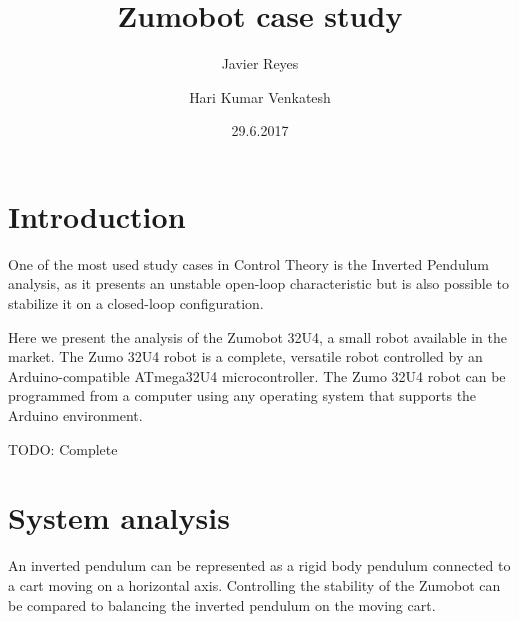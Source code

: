 \documentclass{article}
\title{Zumobot case study}
\date{29.6.2017}
\author{Javier Reyes \and Hari Kumar Venkatesh}
\begin{document}
\maketitle
{}	%
\newpage
{}	%

\tableofcontents
\newpage

\section*{Introduction}	%

One of the most used study cases in Control Theory is the Inverted Pendulum analysis, as it presents an unstable open-loop characteristic but is also possible to stabilize it on a closed-loop configuration.

Here we present the analysis of the Zumobot 32U4, a small robot available in the market. The Zumo 32U4 robot is a complete, versatile robot controlled by an Arduino-compatible ATmega32U4 microcontroller. The Zumo 32U4 robot can be programmed from a computer using any operating system that supports the Arduino environment.

TODO: Complete

\section{System analysis}

An inverted pendulum can be represented as a rigid body pendulum connected to a cart moving on a horizontal axis. Controlling the stability of the Zumobot can be compared to balancing the inverted pendulum on the moving cart.

\end{document}
